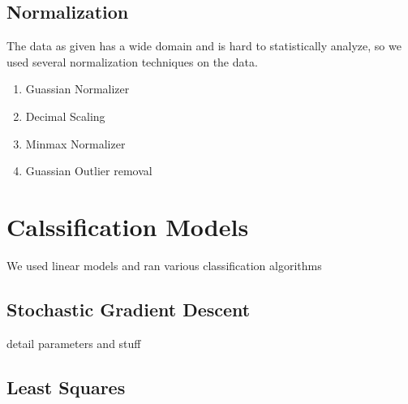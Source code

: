 \documentclass[10pt,conference,compsocconf]{IEEEtran}
\begin{document}
\subsection{Normalization}
The data as given has a wide domain and is hard to statistically analyze, so we used several normalization techniques on the data.
\begin{enumerate}
\item Guassian Normalizer
\item Decimal Scaling
\item Minmax Normalizer
\item Guassian Outlier removal
\end{enumerate}

\section{Calssification Models}
\label{sec:ClassModels}

We used linear models and ran various classification algorithms

\subsection{Stochastic Gradient Descent}
detail parameters and stuff

\subsection{Least Squares}
\end{document}
